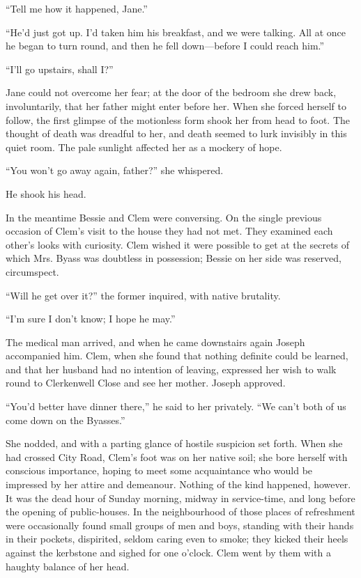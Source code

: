 ``Tell me how it happened, Jane.''

``He'd just got up. I'd taken him his breakfast, and we were talking.
All at once he began to turn round, and then he fell down---before I
could reach him.''

``I'll go upstairs, shall I?''

Jane could not overcome her fear; at the door of the bedroom she drew
back, involuntarily, that her father might enter before her. When she
forced herself to follow, the first {}glimpse of the motionless form
shook her from head to foot. The thought of death was dreadful to her,
and death seemed to lurk invisibly in this quiet room. The pale sunlight
affected her as a mockery of hope.

``You won't go away again, father?'' she whispered.

He shook his head.

In the meantime Bessie and Clem were conversing. On the single previous
occasion of Clem's visit to the house they had not met. They examined
each other's looks with curiosity. Clem wished it were possible to get
at the secrets of which Mrs. Byass was doubtless in possession; Bessie
on her side was reserved, circumspect.

``Will he get over it?'' the former inquired, with native brutality.

``I'm sure I don't know; I hope he may.''

The medical man arrived, and when he came downstairs again Joseph
accompanied him. Clem, when she found that nothing definite could be
learned, and that her husband had no intention of leaving, expressed her
wish to walk round to Clerkenwell Close and see her mother. Joseph
approved.

{}``You'd better have dinner there,'' he said to her privately. ``We
can't both of us come down on the Byasses.''

She nodded, and with a parting glance of hostile suspicion set forth.
When she had crossed City Road, Clem's foot was on her native soil; she
bore herself with conscious importance, hoping to meet some acquaintance
who would be impressed by her attire and demeanour. Nothing of the kind
happened, however. It was the dead hour of Sunday morning, midway in
service-time, and long before the opening of public-houses. In the
neighbourhood of those places of refreshment were occasionally found
small groups of men and boys, standing with their hands in their
pockets, dispirited, seldom caring even to smoke; they kicked their
heels against the kerbstone and sighed for one o'clock. Clem went by
them with a haughty balance of her head.

